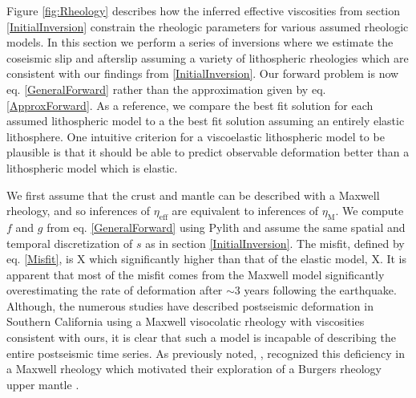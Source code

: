 \documentclass[12pt]{article}
\begin{document}
Figure \ref{fig:Rheology} describes how the inferred effective viscosities from section \ref{InitialInversion} constrain the rheologic parameters for various assumed rheologic models. In this section we perform a series of inversions where we estimate the coseismic slip and afterslip assuming a variety of lithospheric rheologies which are consistent with our findings from \ref{InitialInversion}.  Our forward problem is now eq. \ref{GeneralForward} rather than the approximation given by eq. \ref{ApproxForward}.  As a reference, we compare the best fit solution for each assumed lithospheric model to a the best fit solution assuming an entirely elastic lithosphere. One intuitive criterion for a viscoelastic lithospheric model to be plausible is that it should be able to predict observable deformation better than a lithospheric model which is elastic.   

We first assume that the crust and mantle can be described with a Maxwell rheology, and so inferences of $\eta_{\mathrm{eff}}$ are equivalent to inferences of $\eta_{\mathrm{M}}$. We compute $f$ and $g$ from eq. \ref{GeneralForward} using Pylith \cite{Aagaard2009} and assume the same spatial and temporal discretization of $s$ as in section \ref{InitialInversion}. The misfit, defined by eq. \ref{Misfit}, is X which significantly higher than that of the elastic model, X.  It is apparent that most of the misfit comes from the Maxwell model significantly overestimating the rate of deformation after $\sim 3$ years following the earthquake.  Although, the numerous studies have described postseismic deformation in Southern California using a Maxwell visocolatic rheology with viscosities consistent with ours, it is clear that such a model is incapable of describing the entire postseismic time series. As previously noted, \cite{Pollitz2001}, recognized this deficiency in a Maxwell rheology which motivated their exploration of a Burgers rheology upper mantle \cite{Pollitz2003}.
\end{document}
